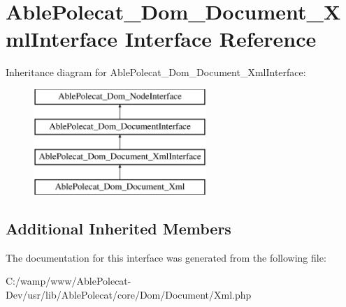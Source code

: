 \hypertarget{interface_able_polecat___dom___document___xml_interface}{}\section{Able\+Polecat\+\_\+\+Dom\+\_\+\+Document\+\_\+\+Xml\+Interface Interface Reference}
\label{interface_able_polecat___dom___document___xml_interface}
Inheritance diagram for Able\+Polecat\+\_\+\+Dom\+\_\+\+Document\+\_\+\+Xml\+Interface\+:\begin{figure}[H]
\begin{center}
\leavevmode
\includegraphics[height=4.000000cm]{interface_able_polecat___dom___document___xml_interface}
\end{center}
\end{figure}
\subsection*{Additional Inherited Members}


The documentation for this interface was generated from the following file\+:\begin{DoxyCompactItemize}
\item 
C\+:/wamp/www/\+Able\+Polecat-\/\+Dev/usr/lib/\+Able\+Polecat/core/\+Dom/\+Document/Xml.\+php\end{DoxyCompactItemize}
